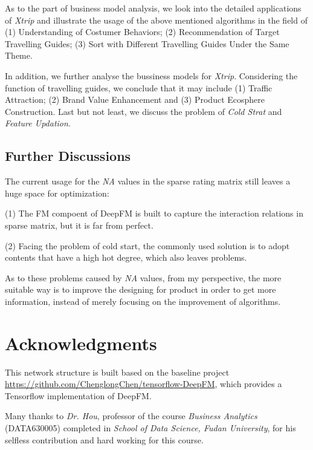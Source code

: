 \documentclass{article}
\begin{document}
    As to the part of business model analysis, we look into the detailed applications of \emph{Xtrip} and illustrate the usage of the above mentioned algorithms in the field of (1) Understanding of Costumer Behaviors; (2) Recommendation of Target Travelling Guides; (3) Sort with Different Travelling Guides Under the Same Theme. 

    In addition, we further analyse the bussiness models for \emph{Xtrip}. Considering the function of travelling guides, we conclude that it may include (1) Traffic Attraction; (2) Brand Value Enhancement and (3) Product Ecosphere Construction. Last but not least, we discuss the problem of \emph{Cold Strat} and \emph{Feature Updation}.

    \subsection{Further Discussions}

    The current usage for the \emph{NA} values in the sparse rating matrix still leaves a huge space for optimization: 

    (1) The FM compoent of DeepFM is built to capture the interaction relations in sparse matrix, but it is far from perfect. 

    (2) Facing the problem of cold start, the commonly used solution is to adopt contents that have a high hot degree, which also leaves problems. 

    As to these problems caused by \emph{NA} values, from my perspective, the more suitable way is to improve the designing for product in order to get more information, instead of merely focusing on the improvement of algorithms. 

	
	\newpage
	\section{Acknowledgments} This network structure is built based on the baseline project \url{https://github.com/ChenglongChen/tensorflow-DeepFM}, which provides a Tensorflow implementation of DeepFM. 

	Many thanks to \emph{Dr. Hou}, professor of the course \emph{Business Analytics} (DATA630005) completed in \emph{School of Data Science, Fudan University}, for his selfless contribution and hard working for this course.

	
	
\end{document}

